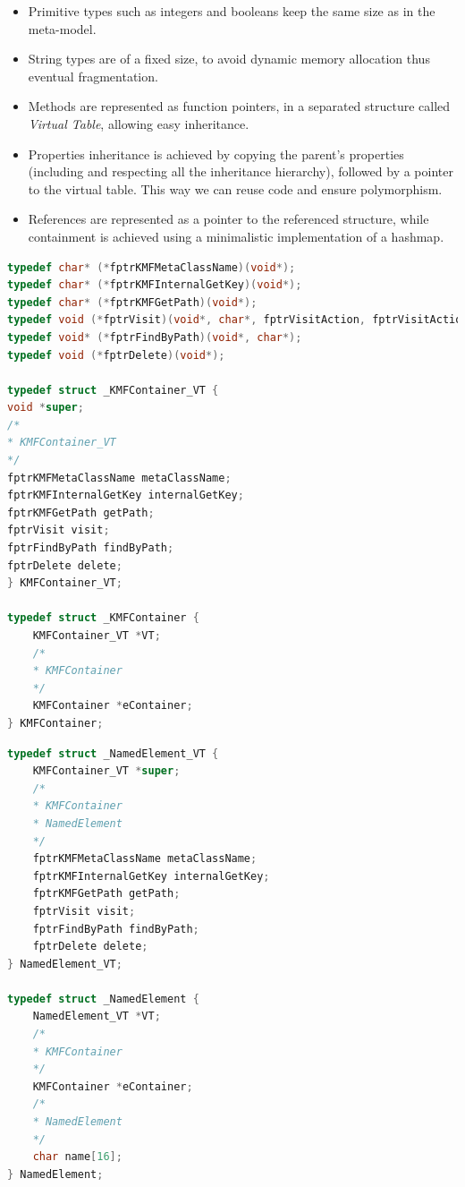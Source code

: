 \begin{itemize}
	\item Primitive types such as integers and booleans keep the same size as in the meta-model.
	\item String types are of a fixed size, to avoid dynamic memory allocation thus eventual fragmentation.
	\item Methods are represented as function pointers, in a separated structure called \textit{Virtual Table}, allowing easy inheritance.
	\item Properties inheritance is achieved by copying the parent's properties (including and respecting all the inheritance hierarchy), followed by a pointer to the virtual table. This way we can reuse code and ensure polymorphism.
	\item References are represented as a pointer to the referenced structure, while containment is achieved using a minimalistic implementation of a hashmap.
\end{itemize}


\begin{lstlisting}[language=C, caption=KMFContainer: the main container on Kevoree, label=lst:KMFContainer]
typedef char* (*fptrKMFMetaClassName)(void*);
typedef char* (*fptrKMFInternalGetKey)(void*);
typedef char* (*fptrKMFGetPath)(void*);
typedef void (*fptrVisit)(void*, char*, fptrVisitAction, fptrVisitActionRef, bool);
typedef void* (*fptrFindByPath)(void*, char*);
typedef void (*fptrDelete)(void*);

typedef struct _KMFContainer_VT {
void *super;
/*
* KMFContainer_VT
*/
fptrKMFMetaClassName metaClassName;
fptrKMFInternalGetKey internalGetKey;
fptrKMFGetPath getPath;
fptrVisit visit;
fptrFindByPath findByPath;
fptrDelete delete;
} KMFContainer_VT;

typedef struct _KMFContainer {
    KMFContainer_VT *VT;
    /*
    * KMFContainer
    */
    KMFContainer *eContainer;
} KMFContainer;
\end{lstlisting}

\begin{lstlisting}[language=C, caption=NamedElement class representation inheriting from KMFContainer, label=lst:NamedElement]
typedef struct _NamedElement_VT {
    KMFContainer_VT *super;
    /*
    * KMFContainer
    * NamedElement
    */
    fptrKMFMetaClassName metaClassName;
    fptrKMFInternalGetKey internalGetKey;
    fptrKMFGetPath getPath;
    fptrVisit visit;
    fptrFindByPath findByPath;
    fptrDelete delete;
} NamedElement_VT;

typedef struct _NamedElement {
    NamedElement_VT *VT;
    /*
    * KMFContainer
    */
    KMFContainer *eContainer;
    /*
    * NamedElement
    */
    char name[16];
} NamedElement;
\end{lstlisting}

